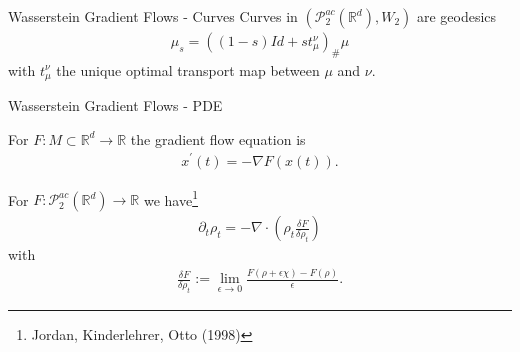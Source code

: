 \documentclass[aspectratio=149]{beamer}
\def\real{\mathbb{R}}
\newcommand{\variation}[1]{\ensuremath{\frac{\delta F}{\delta #1}}}
\begin{document}
\begin{frame}{Wasserstein Gradient Flows - Curves}
Curves in $\left(\mathcal{P}_{2}^{ac}(\real^{d}), W_2\right)$ are geodesics
\begin{align*}
\mu_s=((1-s)Id+st_{\mu}^{\nu})_{\#}\mu
\end{align*}
with $t_{\mu}^{\nu}$ the unique optimal transport map between $\mu$ and $\nu$.
\begin{figure}
\centering
{}
\end{figure}
\end{frame}

\begin{frame}{Wasserstein Gradient Flows - PDE}

For $F:M\subset \real^d\rightarrow \real$ the gradient flow equation is
\begin{align*}
x^\prime(t)=-\nabla F(x(t)).
\end{align*}

For $F:\mathcal{P}_{2}^{ac}(\real^{d})\rightarrow \real$
we have\footnote{Jordan, Kinderlehrer, Otto (1998)}
\begin{align}
\label{eq:pde}
\partial_{t}\rho_{t}=-\nabla\cdot\left(\rho_{t}\variation{\rho_t}\right)
\end{align}
with
\begin{align*}
\variation{\rho_t}:=\lim_{\epsilon\rightarrow0}\frac{F(\rho+\epsilon\chi) - F(\rho)}{ \epsilon}.
\end{align*}
\end{frame}
\end{document}
